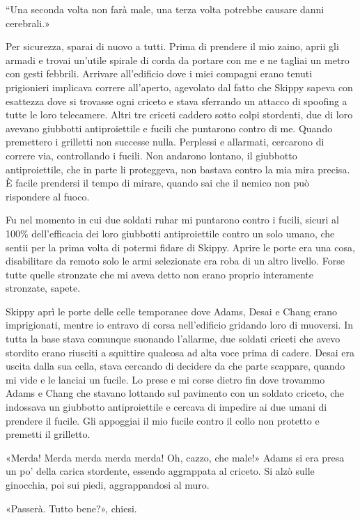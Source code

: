 ``Una seconda volta non farà male, una terza volta potrebbe causare
danni cerebrali.»

Per sicurezza, sparai di nuovo a tutti. Prima di prendere il mio zaino,
aprii gli armadi e trovai un'utile spirale di corda da portare con me e
ne tagliai un metro con gesti febbrili. Arrivare all'edificio dove i
miei compagni erano tenuti prigionieri implicava correre all'aperto,
agevolato dal fatto che Skippy sapeva con esattezza dove si trovasse
ogni criceto e stava sferrando un attacco di spoofing a tutte le loro
telecamere. Altri tre criceti caddero sotto colpi stordenti, due di loro
avevano giubbotti antiproiettile e fucili che puntarono contro di me.
Quando premettero i grilletti non successe nulla. Perplessi e allarmati,
cercarono di correre via, controllando i fucili. Non andarono lontano,
il giubbotto antiproiettile, che in parte li proteggeva, non bastava
contro la mia mira precisa. È facile prendersi il tempo di mirare,
quando sai che il nemico non può rispondere al fuoco.

Fu nel momento in cui due soldati ruhar mi puntarono contro i fucili,
sicuri al 100\% dell'efficacia dei loro giubbotti antiproiettile contro
un solo umano, che sentii per la prima volta di potermi fidare di
Skippy. Aprire le porte era una cosa, disabilitare da remoto solo le
armi selezionate era roba di un altro livello. Forse tutte quelle
stronzate che mi aveva detto non erano proprio interamente stronzate,
sapete.

Skippy aprì le porte delle celle temporanee dove Adams, Desai e Chang
erano imprigionati, mentre io entravo di corsa nell'edificio gridando
loro di muoversi. In tutta la base stava comunque suonando l'allarme,
due soldati criceti che avevo stordito erano riusciti a squittire
qualcosa ad alta voce prima di cadere. Desai era uscita dalla sua cella,
stava cercando di decidere da che parte scappare, quando mi vide e le
lanciai un fucile. Lo prese e mi corse dietro fin dove trovammo Adams e
Chang che stavano lottando sul pavimento con un soldato criceto, che
indossava un giubbotto antiproiettile e cercava di impedire ai due umani
di prendere il fucile. Gli appoggiai il mio fucile contro il collo non
protetto e premetti il grilletto.

«Merda! Merda merda merda merda! Oh, cazzo, che male!» Adams si era
presa un po' della carica stordente, essendo aggrappata al criceto. Si
alzò sulle ginocchia, poi sui piedi, aggrappandosi al muro.

«Passerà. Tutto bene?», chiesi.

